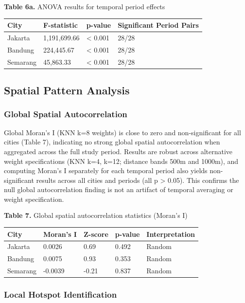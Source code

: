 \documentclass[12pt,a4paper]{article}
\begin{document}
\textbf{Table 6a.} ANOVA results for temporal period effects

\begin{longtable}[]{@{}llll@{}}
\toprule\noalign{}
City & F-statistic & p-value & Significant Period Pairs \\
\midrule\noalign{}
\endhead
\bottomrule\noalign{}
\endlastfoot
Jakarta & 1,191,699.66 & < 0.001 & 28/28 \\
Bandung & 224,445.67 & < 0.001 & 28/28 \\
Semarang & 45,863.33 & < 0.001 & 28/28 \\
\end{longtable}

\subsection{Spatial Pattern Analysis}

\subsubsection{Global Spatial Autocorrelation}

Global Moran's I (KNN k=8 weights) is close to zero and non-significant for all cities (Table 7), indicating no strong global spatial autocorrelation when aggregated across the full study period. Results are robust across alternative weight specifications (KNN k=4, k=12; distance bands 500m and 1000m), and computing Moran's I separately for each temporal period also yields non-significant results across all cities and periods (all p > 0.05). This confirms the null global autocorrelation finding is not an artifact of temporal averaging or weight specification.

\textbf{Table 7.} Global spatial autocorrelation statistics (Moran's I)

\begin{longtable}[]{@{}lllll@{}}
\toprule\noalign{}
City & Moran's I & Z-score & p-value & Interpretation \\
\midrule\noalign{}
\endhead
\bottomrule\noalign{}
\endlastfoot
Jakarta & 0.0026 & 0.69 & 0.492 & Random \\
Bandung & 0.0075 & 0.93 & 0.353 & Random \\
Semarang & -0.0039 & -0.21 & 0.837 & Random \\
\end{longtable}

\subsubsection{Local Hotspot Identification}
\end{document}
